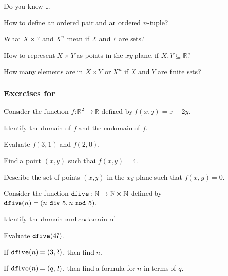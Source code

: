 \begin{exer}[\exerR] %
\label{exer_dyk_cart_prod}
    Do you know \ldots
        \begin{exerpart}
            \item How to define an ordered pair and an ordered $n$-tuple?
            \item What $X \times Y$ and $X^n$ mean if $X$ and $Y$ are sets?
            \item How to represent $X \times Y$ as points in the $xy$-plane, if $X, Y \subseteq \mathbb{R}$?
            \item How many elements are in $X \times Y$ or $X^n$ if $X$ and $Y$ are finite sets?
        \end{exerpart}
\end{exer}  


\subsubsection*{Exercises for 
\subfncartprod}

\begin{exer}[\exerP] %
\label{exer_linear_fn_onRsq} 
    Consider the function $f: \mathbb{R}^2 \to \mathbb{R}$ defined by $f(x,y) = x-2y$.
        \begin{exerpart}
            \item Identify the domain of $f$ and the codomain of $f$.
            \item Evaluate $f(3,1)$ and $f(2,0)$.
            \item Find a point $(x,y)$ such that $f(x,y) = 4$.  
            \item Describe the set of points $(x,y)$ in the $xy$-plane such that $f(x,y) = 0$.  
        \end{exerpart}
\end{exer}

\begin{exer}[\exerP] %
\label{exer_fn_into_Zsq_div_mod}
    Consider the function $\texttt{dfive}: \mathbb{N} \to \mathbb{N} \times \mathbb{N}$ defined by $\texttt{dfive}(n) = (n ~\texttt{div}~ 5, n ~\texttt{mod}~ 5)$.
        \begin{exerpart}
            \item Identify the domain and codomain of .  
            \item Evaluate $\texttt{dfive}(47)$.
            \item If $\texttt{dfive}(n)=(3,2)$, then find $n$.
            \item If $\texttt{dfive}(n)=(q,2)$, then find a formula for $n$ in terms of $q$.
        \end{exerpart}
\end{exer}

